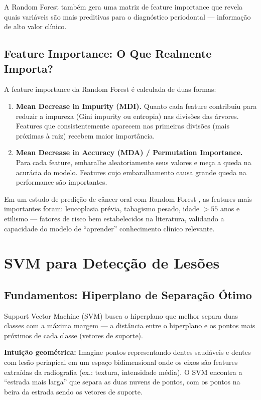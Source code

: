 A Random Forest também gera uma matriz de feature importance que revela quais variáveis são mais preditivas para o diagnóstico periodontal — informação de alto valor clínico.

\subsection{Feature Importance: O Que Realmente Importa?}

A feature importance  da Random Forest é calculada de duas formas:

\begin{enumerate}
    \item \textbf{Mean Decrease in Impurity (MDI).} Quanto cada feature contribuiu para reduzir a impureza (Gini impurity ou entropia) nas divisões das árvores. Features que consistentemente aparecem nas primeiras divisões (mais próximas à raiz) recebem maior importância.
    \item \textbf{Mean Decrease in Accuracy (MDA) / Permutation Importance.} Para cada feature, embaralhe aleatoriamente seus valores e meça a queda na acurácia do modelo. Features cujo embaralhamento causa grande queda na performance são importantes.
\end{enumerate}

Em um estudo de predição de câncer oral com Random Forest \cite{ODT-025}, as features mais importantes foram: leucoplasia prévia, tabagismo pesado, idade $>55$ anos e etilismo — fatores de risco bem estabelecidos na literatura, validando a capacidade do modelo de ``aprender'' conhecimento clínico relevante.

\section{SVM para Detecção de Lesões}

\subsection{Fundamentos: Hiperplano de Separação Ótimo}

Support Vector Machine (SVM)  busca o hiperplano que melhor separa duas classes com a máxima margem — a distância entre o hiperplano e os pontos mais próximos de cada classe (vetores de suporte).

\textbf{Intuição geométrica:} Imagine pontos representando dentes saudáveis e dentes com lesão periapical em um espaço bidimensional onde os eixos são features extraídas da radiografia (ex.: textura, intensidade média). O SVM encontra a ``estrada mais larga'' que separa as duas nuvens de pontos, com os pontos na beira da estrada sendo os vetores de suporte.

